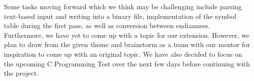 \documentclass[11pt]{article}
\begin{document}
\begin{flushleft}
Some tasks moving forward which we think may be challenging include parsing text-based input and writing into a binary file, implementation of the symbol table during the first pass, as well as conversion between endianness. Furthermore, we have yet to come up with a topic for our extension. However, we plan to draw from the given theme and brainstorm as a team with our mentor for inspiration to come up with an original topic. We have also decided to focus on the upcoming C Programming Test over the next few days before continuing with the project.  
\end{flushleft}
\end{document}
